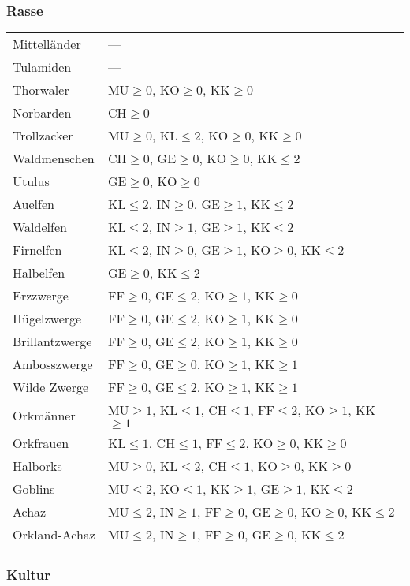 \subsubsection{Rasse}
\begin{tabular}{ll}
Mittelländer & --- \\
Tulamiden & --- \\
Thorwaler & MU$\ge 0$, KO$\ge 0$, KK$\ge 0$ \\
Norbarden & CH$\ge 0$ \\
Trollzacker & MU$\ge 0$, KL$\le 2$, KO$\ge 0$, KK$\ge 0$ \\
Waldmenschen & CH$\ge 0$, GE$\ge 0$, KO$\ge 0$, KK$\le 2$ \\
Utulus & GE$\ge 0$, KO$\ge 0$ \\
Auelfen & KL$\le 2$, IN$\ge 0$, GE$\ge 1$, KK$\le 2$ \\
Waldelfen & KL$\le 2$, IN$\ge 1$, GE$\ge 1$, KK$\le 2$ \\
Firnelfen & KL$\le 2$, IN$\ge 0$, GE$\ge 1$, KO$\ge 0$, KK$\le 2$ \\
Halbelfen & GE$\ge 0$, KK$\le 2$ \\
Erzzwerge & FF$\ge 0$, GE$\le 2$, KO$\ge 1$, KK$\ge 0$ \\
Hügelzwerge & FF$\ge 0$, GE$\le 2$, KO$\ge 1$, KK$\ge 0$ \\
Brillantzwerge & FF$\ge 0$, GE$\le 2$, KO$\ge 1$, KK$\ge 0$ \\
Ambosszwerge & FF$\ge 0$, GE$\ge 0$, KO$\ge 1$, KK$\ge 1$ \\
Wilde Zwerge & FF$\ge 0$, GE$\le 2$, KO$\ge 1$, KK$\ge 1$ \\
Orkmänner & MU$\ge 1$, KL$\le 1$, CH$\le 1$, FF$\le 2$, KO$\ge 1$, KK$\ge 1$ \\
Orkfrauen & KL$\le 1$, CH$\le 1$, FF$\le 2$, KO$\ge 0$, KK$\ge 0$ \\
Halborks & MU$\ge 0$, KL$\le 2$, CH$\le 1$, KO$\ge 0$, KK$\ge 0$ \\
Goblins & MU$\le 2$, KO$\le 1$, KK$\ge 1$, GE$\ge 1$, KK$\le 2$ \\
Achaz & MU$\le 2$,  IN$\ge 1$, FF$\ge 0$, GE$\ge 0$, KO$\ge 0$, KK$\le 2$ \\
Orkland-Achaz & MU$\le 2$, IN$\ge 1$, FF$\ge 0$, GE$\ge 0$, KK$\le 2$ \\
\end{tabular}

\subsubsection{Kultur}

